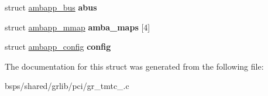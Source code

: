 \begin{DoxyCompactItemize}
struct \mbox{\hyperlink{structambapp__bus}{ambapp\+\_\+bus}} {\bfseries abus}
\item 
\mbox{\label{structgr__tmtc__1553__priv_a6cd3f15905eb770ed665fa8a9bf9f637}} 
struct \mbox{\hyperlink{structambapp__mmap}{ambapp\+\_\+mmap}} {\bfseries amba\+\_\+maps} \mbox{[}4\mbox{]}
\item 
\mbox{\label{structgr__tmtc__1553__priv_a8b771240e89c8c65edc2db3543a888ac}} 
struct \mbox{\hyperlink{structambapp__config}{ambapp\+\_\+config}} {\bfseries config}
\end{DoxyCompactItemize}


The documentation for this struct was generated from the following file\+:\begin{DoxyCompactItemize}
\item 
bsps/shared/grlib/pci/gr\+\_\+tmtc\+\_.\+c\end{DoxyCompactItemize}
